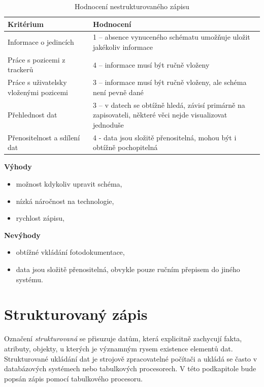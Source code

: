 \begin{table}[H]
	\begin{tabularx}{\textwidth}{ | X | X | }
		\hline
		Kritérium                              & Hodnocení \\
 		\hline			
		Informace o jedincích                  & 1 -- absence vynuceného schématu umožňuje uložit jakékoliv informace          \\
		\hline
		Práce s pozicemi z trackerů            & 4 -- informace musí být ručně vloženy          \\
		\hline
		Práce s uživatelsky vloženými pozicemi & 3 -- informace musí být ručně vloženy, ale schéma není pevně dané          \\
		\hline
		Přehlednost dat                        & 3 -- v datech se obtížně hledá, závisí primárně na zapisovateli, některé věci nejde visualizovat jednoduše          \\
		\hline
		Přenositelnost a sdílení dat           & 4 - data jsou složitě přenositelná, mohou být i obtížně pochopitelná          \\
		\hline	
	\end{tabularx}
	\caption{Hodnocení nestrukturovaného zápisu}
\end{table}
\clearpage
\textbf{Výhody}
\nolisttopbreak
\begin{itemize}
	\item možnost kdykoliv upravit schéma,
	\item nízká náročnost na technologie,
	\item rychlost zápisu,
\end{itemize}

\textbf{Nevýhody}
\nolisttopbreak
\begin{itemize}
	\item obtížné vkládání fotodokumentace,
	\item data jsou složitě přenositelná, obvykle pouze ručním přepisem do jiného systému.
\end{itemize}

\section{Strukturovaný zápis}

Označení \emph{strukturovaná} se přisuzuje datům, která explicitně zachycují fakta, atributy, objekty, u kterých je významným rysem existence elementů dat. Strukturované ukládání dat je strojově zpracovatelné počítači a ukládá se často v databázových systémech \cite{sklenak2001data} nebo tabulkových procesorech. V této podkapitole bude popsán zápis pomocí tabulkového procesoru.

